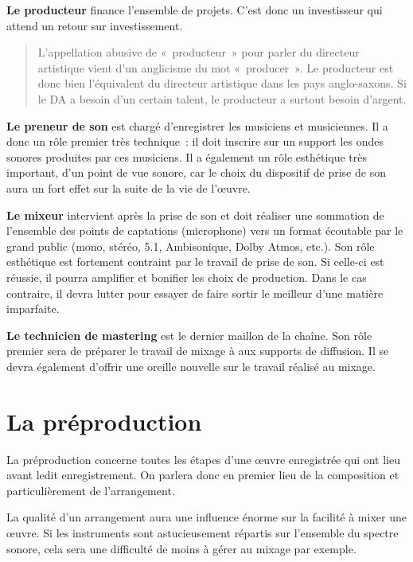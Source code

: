 \documentclass[
  letterpaper,
  DIV=11,
  numbers=noendperiod]{scrreprt}
\begin{document}
\textbf{Le producteur} finance l'ensemble de projets. C'est donc un
investisseur qui attend un retour sur investissement.

\begin{quote}
L'appellation abusive de «~producteur~» pour parler du directeur
artistique vient d'un anglicisme du mot «~producer~». Le producteur est
donc bien l'équivalent du directeur artistique dans les pays
anglo-saxons. Si le DA a besoin d'un certain talent, le producteur a
surtout besoin d'argent.
\end{quote}

\textbf{Le preneur de son} est chargé d'enregistrer les musiciens et
musiciennes. Il a donc un rôle premier très technique~: il doit inscrire
sur un support les ondes sonores produites par ces musiciens. Il a
également un rôle esthétique très important, d'un point de vue sonore,
car le choix du dispositif de prise de son aura un fort effet sur la
suite de la vie de l'œuvre.

\textbf{Le mixeur} intervient après la prise de son et doit réaliser une
sommation de l'ensemble des points de captations (microphone) vers un
format écoutable par le grand public (mono, stéréo, 5.1, Ambisonique,
Dolby Atmos, etc.). Son rôle esthétique est fortement contraint par le
travail de prise de son. Si celle-ci est réussie, il pourra amplifier et
bonifier les choix de production. Dans le cas contraire, il devra lutter
pour essayer de faire sortir le meilleur d'une matière imparfaite.

\textbf{Le technicien de mastering} est le dernier maillon de la chaîne.
Son rôle premier sera de préparer le travail de mixage à aux supports de
diffusion. Il se devra également d'offrir une oreille nouvelle sur le
travail réalisé au mixage.

\hypertarget{la-pruxe9production}{%
\section{La préproduction}\label{la-pruxe9production}}

La préproduction concerne toutes les étapes d'une œuvre enregistrée qui
ont lieu avant ledit enregistrement. On parlera donc en premier lieu de
la composition et particulièrement de l'arrangement.

La qualité d'un arrangement aura une influence énorme sur la facilité à
mixer une œuvre. Si les instruments sont astucieusement répartis sur
l'ensemble du spectre sonore, cela sera une difficulté de moins à gérer
au mixage par exemple.
\end{document}

